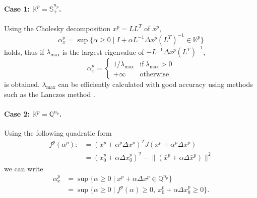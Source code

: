 \paragraph{Case 1: $\mathbb{K}^p = \mathbb{S}^{n_p}_+$.}

Using the Cholesky decomposition $x^p=LL^T$ of $x^p$,
\[\alpha^p_x = \sup\{\alpha \geq 0 \mid I + \alpha L^{-1} \Delta x^p (L^T)^{-1} \in \mathbb{K}^p\}\]
holds, thus if $\lambda_{\max}$ is the largest eigenvalue of $-L^{-1} \Delta x^p (L^T)^{-1}$,
\[\alpha^p_x = \begin{cases}
    1/\lambda_{\max} & \text{if} ~ \lambda_{\max} > 0 \\
    +\infty & \text{otherwise}
\end{cases}\]
is obtained.
$\lambda_{\max}$ can be efficiently calculated with good accuracy using methods such as the Lanczos method \cite{Golub2013}.

\paragraph{Case 2: $\mathbb{K}^p = \mathbb{Q}^{n_p}$.}

Using the following quadratic form
\begin{align*}
  f^p(\alpha^p)
  :&= ( x^p + \alpha^p \Delta x^p )^T J ( x^p + \alpha^p \Delta x^p )\\
   &=  ( x^p_0 + \alpha \Delta x^p_0 )^2 - \bigl\|( \bar{x}^p + \alpha \Delta \bar{x}^p )\bigr\|^2
\end{align*}
we can write
\begin{align*}
    \alpha_x^p 
    &= \sup\{\alpha \geq 0 \mid x^p + \alpha \Delta x^p \in \mathbb{Q}^{n_p}\}\\
    &= \sup\{\alpha \geq 0 \mid f^p(\alpha) \geq 0, ~x^p_0 + \alpha \Delta x^p_0 \geq 0\}.
\end{align*}

